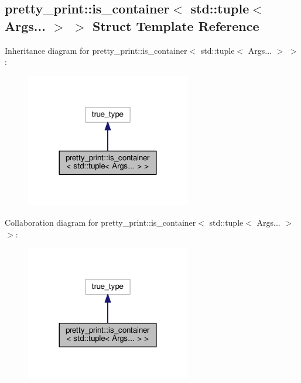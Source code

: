 \hypertarget{structpretty__print_1_1is__container_3_01std_1_1tuple_3_01Args_8_8_8_01_4_01_4}{}\subsection{pretty\+\_\+print\+:\+:is\+\_\+container$<$ std\+:\+:tuple$<$ Args... $>$ $>$ Struct Template Reference}
\label{structpretty__print_1_1is__container_3_01std_1_1tuple_3_01Args_8_8_8_01_4_01_4}


Inheritance diagram for pretty\+\_\+print\+:\+:is\+\_\+container$<$ std\+:\+:tuple$<$ Args... $>$ $>$\+:
\nopagebreak
\begin{figure}[H]
\begin{center}
\leavevmode
\includegraphics[width=204pt]{structpretty__print_1_1is__container_3_01std_1_1tuple_3_01Args_8_8_8_01_4_01_4__inherit__graph}
\end{center}
\end{figure}


Collaboration diagram for pretty\+\_\+print\+:\+:is\+\_\+container$<$ std\+:\+:tuple$<$ Args... $>$ $>$\+:
\nopagebreak
\begin{figure}[H]
\begin{center}
\leavevmode
\includegraphics[width=204pt]{structpretty__print_1_1is__container_3_01std_1_1tuple_3_01Args_8_8_8_01_4_01_4__coll__graph}
\end{center}
\end{figure}



